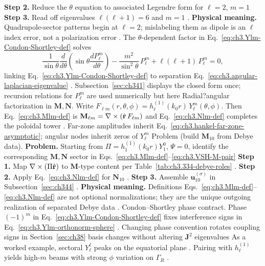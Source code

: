 \textbf{Step 2.} Reduce the \(\theta\) equation to associated Legendre form for \(\ell=2\), \(m=1\)
\textbf{Step 3.} Read off eigenvalues \(\ell(\ell+1)=6\) and \(m=1\) .
\textbf{Physical meaning.} Quadrupole-sector patterns begin at \(\ell=2\); mislabeling them as dipole is an
\(\ell\) index error, not a polarization error .
The \(\theta\)-dependent factor in Eq.~\eqref{eq:ch3.Ylm-Condon-Shortley-def} solves
\begin{equation}
\label{eq:ch3.associated-Legendre-equation}
\frac{1}{\sin\theta}\frac{d}{d\theta}
\!\left(\sin\theta\frac{dP_{\ell}^{m}}{d\theta}\right)
-\frac{m^{2}}{\sin^{2}\theta}\,P_{\ell}^{m}
+\ell(\ell+1)\,P_{\ell}^{m}=0,
\end{equation}
linking Eq.~\eqref{eq:ch3.Ylm-Condon-Shortley-def} to separation
Eq.~\eqref{eq:ch3.angular-laplacian-eigenvalue} . Subsection~\ref{sec:ch341}
displays the closed form once; recursion relations for \(P_{\ell}^{m}\) are used numerically but here
Radial?angular factorization in \(\mathbf{M},\mathbf{N}\). Write \(F_{\ell m}(r,\theta,\phi)=h_{\ell}^{(1)}(k_{0}r)\,Y_{\ell}^{m}(\theta,\phi)\). Then
Eq.~\eqref{eq:ch3.Mlm-def} is \(\mathbf{M}_{\ell m}=\nabla\times(\hat{\mathbf{r}}\,F_{\ell m})\) and
Eq.~\eqref{eq:ch3.Nlm-def} completes the poloidal tower . Far-zone amplitudes inherit
Eq.~\eqref{eq:ch3.hankel-far-zone-asymptotic}; angular nodes inherit zeros of \(Y_{\ell}^{m}\)
Problem (build \(\mathbf{M}_{10}\) from Debye data). \textbf{Problem.} Starting from \(\Pi=h_{1}^{(1)}(k_{0}r)Y_{1}^{0}\), \(\Psi=0\), identify the corresponding
\(\mathbf{M},\mathbf{N}\) sector in Eqs.~\eqref{eq:ch3.Mlm-def}--\eqref{eq:ch3.VSH-M-pair}
\textbf{Step 1.} Map \(\nabla\times(\Pi\hat{\mathbf{r}})\) to \(\mathbf{M}\)-type content per
Table~\ref{tab:ch3.334-debye-roles} .
\textbf{Step 2.} Apply Eq.~\eqref{eq:ch3.Nlm-def} for \(\mathbf{N}_{10}\) .
\textbf{Step 3.} Assemble \(\mathbf{u}_{10}^{(\sigma)}\) in Subsection~\ref{sec:ch344} .
\textbf{Physical meaning.} Definitions Eqs.~\eqref{eq:ch3.Mlm-def}--\eqref{eq:ch3.Nlm-def} are not optional
normalizations; they are the unique outgoing realization of separated Debye data .
Condon--Shortley phase contract. Phase \((-1)^{m}\) in Eq.~\eqref{eq:ch3.Ylm-Condon-Shortley-def} fixes interference signs in
Eq.~\eqref{eq:ch3.Ylm-orthonorm-sphere} . Changing phase convention rotates
coupling signs in Section~\ref{sec:ch38} basis changes without altering \(\mathbf{J}^{2}\) eigenvalues
As a worked example, sectoral \(Y_{\ell}^{\ell}\) peaks on the equatorial plane . Pairing with
\(h_{\ell}^{(1)}\) yields high-\(m\) beams with strong \(\phi\) variation on \(\Gamma_R\) .
